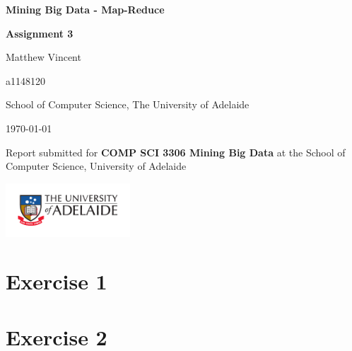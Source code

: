 \documentclass[12t]{article}
\begin{document}
 	\newcommand{\titlestr}{Mining Big Data - Map-Reduce}
 	\newcommand{\shorttitlestr}{Assignment 3}
 	\newcommand{\groupnames}{Matthew Vincent}
 	\newcommand{\studentids}{a1148120}
 	\newcommand{\authorstr}{\groupnames}
 	
 	\begin{titlepage}
 		\centering
 		
 		{\LARGE \bf \titlestr \par}
 		\vspace{0.25cm}
 		{\large \bf \shorttitlestr \par}
 		
 		
 		\vspace{1cm}
 		{\large \authorstr \\}
 		{ \studentids \par}
 		\vspace{0.25cm}
 		
 		\large School of Computer Science, The University of Adelaide
 		
 		\vspace{1cm}
 		\today
 		
 		\vspace{3cm}
 		Report submitted for
 		{\bf COMP SCI 3306 Mining Big Data}
 		at the School of Computer Science,
 		University of Adelaide
 		
 		\includegraphics[width=0.35\textwidth]{./Figures/UoA_logo_cmyk.pdf}
 		
 		\vspace{9cm}
 		

 	 	\vspace{1mm}
 		\noindent \hrulefill
 		
 		\vfill
 	\end{titlepage}
 	
 	\clearpage
 	\setcounter{page}{1}
	
	\section*{Exercise 1}

	

	\newpage
	
	\section*{Exercise 2}
\end{document}
